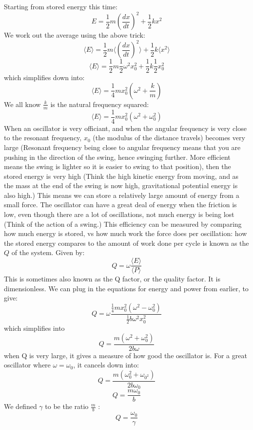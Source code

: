 \documentclass[10pt]{report}
\begin{document}
{{\par{Starting from stored energy this time: \[
E=\frac{1}{2}m\left(\frac{dx}{dt}\right)^{2}+\frac{1}{2}kx^{2}
\] We work out the average using the above trick: \[
\langle E\rangle=\frac{1}{2}m\langle\left(\frac{dx}{dt}\right)^{2}\rangle+\frac{1}{2}k\langle x^{2}\rangle
\] \[
\langle E\rangle=\frac{1}{2}m\frac{1}{2}\omega^{2}x_{0}^{2}+\frac{1}{2}k\frac{1}{2}x_{0}^{2}
\] which simplifies down into: \[
\langle E\rangle=\frac{1}{4}mx_{0}^{2}\left(\omega^{2}+\frac{k}{m}\right)
\] We all know $\frac{k}{m}$ is the natural frequency squared: \[
\langle E\rangle=\frac{1}{4}mx_{0}^{2}\left(\omega^{2}+\omega_{0}^{2}\right)
\] When an oscillator is very officiant, and when the angular frequency is very close to the resonant frequency, $x_{0}$ (the modulus of the distance travels) becomes very large (Resonant frequency being close to angular frequency means that you are pushing in the direction of the swing, hence swinging further. More efficient means the swing is lighter so it is easier to swing to that position), then the stored energy is very high (Think the high kinetic energy from moving, and as the mass at the end of the swing is now high, gravitational potential energy is also high.) This means we can store a relatively large amount of energy from a small force. The oscillator can have a great deal of energy when the friction is low, even though there are a lot of oscillations, not much energy is being lost (Think of the action of a swing.) This efficiency can be measured by comparing how much energy is stored, vs how much work the force does per oscillation: how the stored energy compares to the amount of work done per cycle is known as the $Q$ of the system. Given by:  \[
Q=\omega\frac{\langle E\rangle}{\langle P\rangle}
\] This is sometimes also known as the Q factor, or the quality factor. It is dimensionless. We can plug in the equations for energy and power from earlier, to give: \[
Q=\omega\frac{\frac{1}{4}mx_{0}^{2}\left(\omega^{2}-\omega_{0}^{2}\right)}{\frac{1}{2}b\omega^{2}x_{0}^{2}}
\] which simplifies into \[
Q=\frac{m\left(\omega^{2}+\omega_{0}^{2}\right)}{2b\omega}
\] when Q is very large, it gives a measure of how good the oscillator is. For a great oscillator where $\omega=\omega_{0}$, it cancels down into: \[
Q=\frac{m\left(\omega_{0}^{2}+\omega_{0^{2}}\right)}{2b\omega_{0}}
\] \[
Q=\frac{m\omega_{0}}{b}
\] We defined $\gamma$ to be the ratio $\frac{m}{b}$ : \[
Q=\frac{\omega_{0}}{\gamma}
\] }
}}
\end{document}
